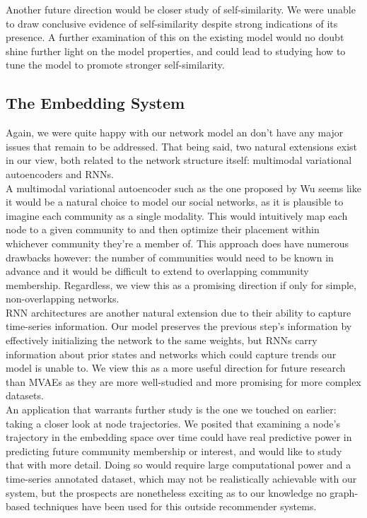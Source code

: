 \documentclass[12pt,twoside]{report}
\begin{document}
Another future direction would be closer study of self-similarity. We were unable to draw conclusive evidence of self-similarity despite strong indications of its presence. A further examination of this on the existing model would no doubt shine further light on the model properties, and could lead to studying how to tune the model to promote stronger self-similarity. \\

\subsection{The Embedding System}

Again, we were quite happy with our network model an don't have any major issues that remain to be addressed. That being said, two natural extensions exist in our view, both related to the network structure itself: multimodal variational autoencoders and RNNs. \\

A multimodal variational autoencoder such as the one proposed by Wu \cite{wu2018multimodal} seems like it would be a natural choice to model our social networks, as it is plausible to imagine each community as a single modality. This would intuitively map each node to a given community to and then optimize their placement within whichever community they're a member of. This approach does have numerous drawbacks however: the number of communities would need to be known in advance and it would be difficult to extend to overlapping community membership. Regardless, we view this as a promising direction if only for simple, non-overlapping networks. \\

RNN architectures are another natural extension due to their ability to capture time-series information. Our model preserves the previous step's information by effectively initializing the network to the same weights, but RNNs carry information about prior states and networks which could capture trends our model is unable to. We view this as a more useful direction for future research than MVAEs as they are more well-studied and more promising for more complex datasets. \\

An application that warrants further study is the one we touched on earlier: taking a closer look at node trajectories. We posited that examining a node's trajectory in the embedding space over time could have real predictive power in predicting future community membership or interest, and would like to study that with more detail. Doing so would require large computational power and a time-series annotated dataset, which may not be realistically achievable with our system, but the prospects are nonetheless exciting as to our knowledge no graph-based techniques have been used for this outside recommender systems. \\



 
\end{document}
